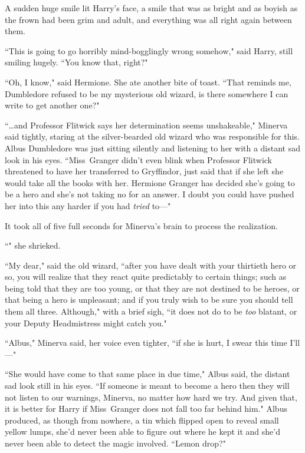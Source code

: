 A sudden huge smile lit Harry's face, a smile that was as bright and as boyish as the frown had been grim and adult, and everything was all right again between them.

``This is going to go horribly mind-bogglingly wrong somehow," said Harry, still smiling hugely. ``You know that, right?"

``Oh, I know," said Hermione. She ate another bite of toast. ``That reminds me, Dumbledore refused to be my mysterious old wizard, is there somewhere I can write to get another one?"


``{\ldots}and Professor Flitwick says her determination seems unshakeable," Minerva said tightly, staring at the silver-bearded old wizard who was responsible for this. Albus Dumbledore was just sitting silently and listening to her with a distant sad look in his eyes. ``Miss~Granger didn't even blink when Professor Flitwick threatened to have her transferred to Gryffindor, just said that if she left she would take all the books with her. Hermione Granger has decided she's going to be a hero and she's not taking no for an answer. I doubt you could have pushed her into this any harder if you had \emph{tried} to—"

It took all of five full seconds for Minerva's brain to process the realization.

``" she shrieked.

``My dear," said the old wizard, ``after you have dealt with your thirtieth hero or so, you will realize that they react quite predictably to certain things; such as being told that they are too young, or that they are not destined to be heroes, or that being a hero is unpleasant; and if you truly wish to be sure you should tell them all three. Although," with a brief sigh, ``it does not do to be \emph{too} blatant, or your Deputy Headmistress might catch you."

``Albus," Minerva said, her voice even tighter, ``if she is hurt, I swear this time I'll—"

``She would have come to that same place in due time," Albus said, the distant sad look still in his eyes. ``If someone is meant to become a hero then they will not listen to our warnings, Minerva, no matter how hard we try. And given that, it is better for Harry if Miss~Granger does not fall too far behind him." Albus produced, as though from nowhere, a tin which flipped open to reveal small yellow lumps, she'd never been able to figure out where he kept it and she'd never been able to detect the magic involved. ``Lemon drop?"

